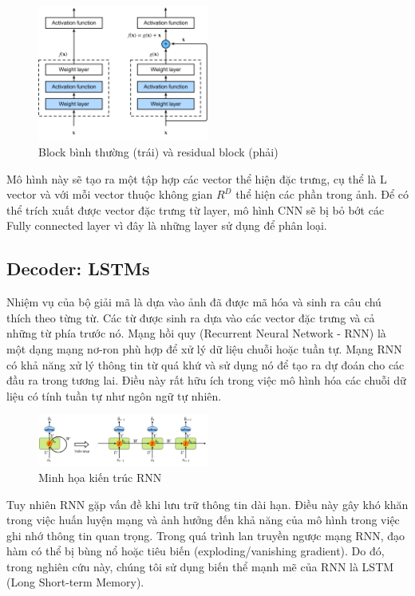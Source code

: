 \documentclass[conference]{IEEEtran}
\begin{document}
\begin{figure}[h]
\includegraphics[width=0.5\textwidth]{assets/residual-block.png}
  \caption{Block bình thường (trái) và residual block (phải) }
  \label{fig:residual_block}
\end{figure}



Mô hình này sẽ tạo ra một tập hợp các vector thể hiện đặc trưng, cụ thể là L vector và với mỗi vector thuộc không gian $R^D$ thể hiện các phần trong ảnh. Để có thể trích xuất được vector đặc trưng từ layer, mô hình CNN sẽ bị bỏ bớt các Fully connected layer vì đây là những layer sử dụng để phân loại. 


\subsection{Decoder: LSTMs}
Nhiệm vụ của bộ giải mã là dựa vào ảnh đã được mã hóa và sinh ra câu chú thích theo từng từ.
Các từ được sinh ra dựa vào các vector đặc trưng và cả những từ phía trước nó.
Mạng hồi quy (Recurrent Neural Network - RNN) là một dạng mạng nơ-ron phù hợp để xử lý dữ liệu chuỗi hoặc tuần tự.
Mạng RNN có khả năng xử lý thông tin từ quá khứ và sử dụng nó để tạo ra dự đoán cho các đầu ra trong tương lai.
Điều này rất hữu ích trong việc mô hình hóa các chuỗi dữ liệu có tính tuần tự như ngôn ngữ tự nhiên.

\begin{figure}[h]
\includegraphics[width=0.5\textwidth]{assets/RNN_model.png}
  \caption{Minh họa kiến trúc RNN}
  \label{fig:RNN_architecture}
\end{figure}

Tuy nhiên RNN gặp vấn đề khi lưu trữ thông tin dài hạn.
Điều này gây khó khăn trong việc huấn luyện mạng và ảnh hưởng đến khả năng của mô hình trong việc ghi nhớ thông tin quan trọng.
Trong quá trình lan truyền ngược mạng RNN, đạo hàm có thể bị bùng nổ hoặc tiêu biến (exploding/vanishing gradient).
Do đó, trong nghiên cứu này, chúng tôi sử dụng biến thể mạnh mẽ của RNN là LSTM\cite{hochreiter1997long} (Long Short-term Memory).
\end{document}
